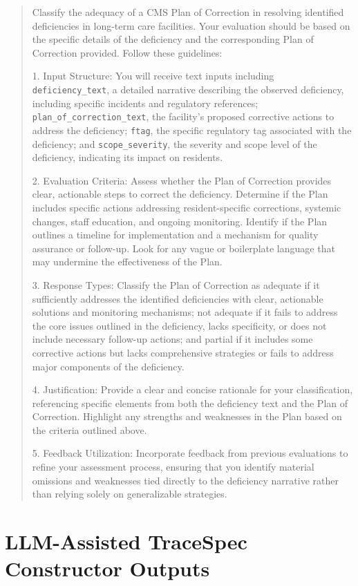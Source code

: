 \documentclass[11pt]{article}
\begin{document}
\begin{quote}\small
Classify the adequacy of a CMS Plan of Correction in resolving identified deficiencies in long-term care facilities. Your evaluation should be based on the specific details of the deficiency and the corresponding Plan of Correction provided. Follow these guidelines:

1. Input Structure: You will receive text inputs including \texttt{deficiency\_text}, a detailed narrative describing the observed deficiency, including specific incidents and regulatory references; \texttt{plan\_of\_correction\_text}, the facility's proposed corrective actions to address the deficiency; \texttt{ftag}, the specific regulatory tag associated with the deficiency; and \texttt{scope\_severity}, the severity and scope level of the deficiency, indicating its impact on residents.

2. Evaluation Criteria: Assess whether the Plan of Correction provides clear, actionable steps to correct the deficiency. Determine if the Plan includes specific actions addressing resident-specific corrections, systemic changes, staff education, and ongoing monitoring. Identify if the Plan outlines a timeline for implementation and a mechanism for quality assurance or follow-up. Look for any vague or boilerplate language that may undermine the effectiveness of the Plan.

3. Response Types: Classify the Plan of Correction as adequate if it sufficiently addresses the identified deficiencies with clear, actionable solutions and monitoring mechanisms; not adequate if it fails to address the core issues outlined in the deficiency, lacks specificity, or does not include necessary follow-up actions; and partial if it includes some corrective actions but lacks comprehensive strategies or fails to address major components of the deficiency.

4. Justification: Provide a clear and concise rationale for your classification, referencing specific elements from both the deficiency text and the Plan of Correction. Highlight any strengths and weaknesses in the Plan based on the criteria outlined above.

5. Feedback Utilization: Incorporate feedback from previous evaluations to refine your assessment process, ensuring that you identify material omissions and weaknesses tied directly to the deficiency narrative rather than relying solely on generalizable strategies.
\end{quote}

\section{LLM-Assisted TraceSpec Constructor Outputs}
\label{app:constructor}
\end{document}
